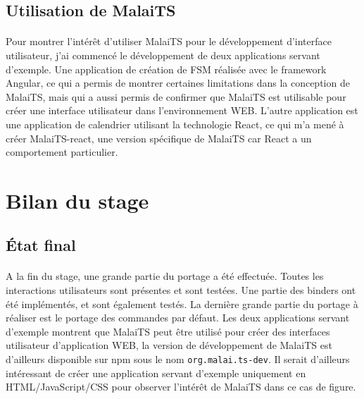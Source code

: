 \documentclass[11pt, a4paper, pdftex]{article}
\newcommand{\info}{\texttt}
\begin{document}
        \subsection{Utilisation de MalaiTS}\label{subsec:travexem}
            \paragraph{}
                Pour montrer l'intérêt d'utiliser MalaiTS pour le développement d'interface utilisateur, j'ai commencé le développement de deux applications servant d'exemple.
                Une application de création de FSM réalisée avec le framework Angular, ce qui a permis de montrer certaines limitations dans la conception de MalaiTS,
                mais qui a aussi permis de confirmer que MalaiTS est utilisable pour créer une interface utilisateur dans l'environnement WEB\@.
                L'autre application est une application de calendrier utilisant la technologie React, ce qui m'a mené à créer MalaiTS-react, une version spécifique de MalaiTS car React a un comportement particulier.

    \newpage
    \section{Bilan du stage}\label{sec:bilsta}
        \subsection{État final}\label{subsec:etatfin}
            \paragraph{}
                A la fin du stage, une grande partie du portage a été effectuée.
                Toutes les interactions utilisateurs sont présentes et sont testées.
                Une partie des binders ont été implémentés, et sont également testés.
                La dernière grande partie du portage à réaliser est le portage des commandes par défaut.
                Les deux applications servant d'exemple montrent que MalaiTS peut être utilisé pour créer des interfaces utilisateur d'application WEB, la version de développement de MalaiTS est d'ailleurs disponible sur npm sous le nom \info{org.malai.ts-dev}.
                Il serait d'ailleurs intéressant de créer une application servant d'exemple uniquement en HTML/JavaScript/CSS pour observer l'intérêt de MalaiTS dans ce cas de figure.
\end{document}
